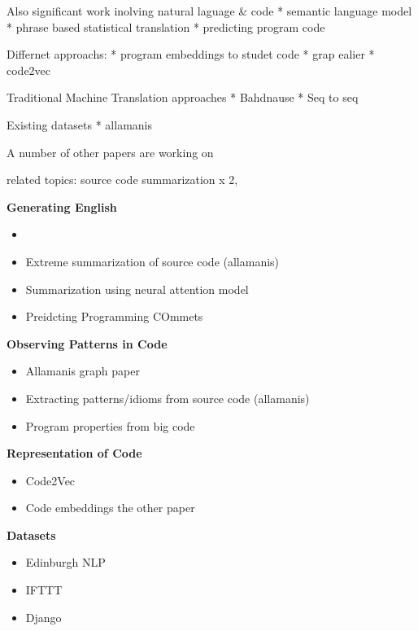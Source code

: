 Also significant work inolving natural laguage & code
* semantic language model
* phrase based statistical translation
* predicting program code

Differnet approachs:
* program embeddings to studet code
* grap ealier
* code2vec

Traditional Machine Translation approaches
* Bahdnause
* Seq to seq

Existing datasets
* allamanis


A number of other papers are working on 


related topics: source code summarization x 2, 

\textbf{Generating English}
\begin{itemize}
    \item 
    \item Extreme summarization of source code (allamanis)
    \item Summarization using neural attention model
    \item Preidcting Programming COmmets
\end{itemize}

\textbf{Observing Patterns in Code}
\begin{itemize}
    \item Allamanis graph paper
    \item Extracting patterns/idioms from source code (allamanis)
    \item Program properties from big code
\end{itemize}

\textbf{Representation of Code}
\begin{itemize}
    \item Code2Vec
    \item Code embeddings the other paper
\end{itemize}

\textbf{Datasets}
\begin{itemize}
    \item Edinburgh NLP
    \item IFTTT
    \item Django 
\end{itemize}




